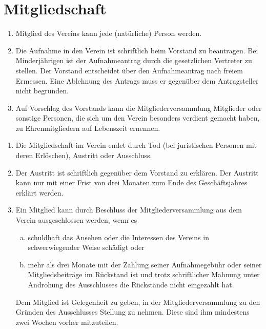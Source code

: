 \documentclass{scrartcl}
\begin{document}
\section{Mitgliedschaft}
\begin{contract}
\Clause[title={Erwerb der Mitgliedschaft}]    
\begin{enumerate}
    \item Mitglied des Vereins kann jede (natürliche) Person werden.
    \item Die Aufnahme in den Verein ist schriftlich beim Vorstand zu beantragen. Bei Minderjährigen ist der Aufnahmeantrag durch die gesetzlichen Vertreter zu stellen. Der Vorstand entscheidet über den Aufnahmeantrag nach freiem Ermessen. Eine Ablehnung des Antrags muss er gegenüber dem Antragsteller nicht begründen.
    \item Auf Vorschlag des Vorstands kann die Mitgliederversammlung Mitglieder oder sonstige Personen, die sich um den Verein besonders verdient gemacht haben, zu Ehrenmitgliedern auf Lebenszeit ernennen.
\end{enumerate}

\Clause[title={Beendigung der Mitgliedschaft}]
\begin{enumerate}
    \item Die Mitgliedschaft im Verein endet durch Tod (bei juristischen Personen mit deren Erlöschen), Austritt oder Ausschluss.
    \item Der Austritt ist schriftlich gegenüber dem Vorstand zu erklären. Der Austritt kann nur mit einer Frist von drei Monaten zum Ende des Geschäftsjahres erklärt werden.
    \item Ein Mitglied kann durch Beschluss der Mitgliederversammlung aus dem Verein
    ausgeschlossen werden, wenn es 
    \begin{enumerate}[(a)]
        \item schuldhaft das Ansehen oder die Interessen des
        Vereins in schwerwiegender Weise schädigt oder
        \item mehr als drei Monate mit der Zahlung
        seiner Aufnahmegebühr oder seiner Mitgliedsbeiträge im Rückstand ist und trotz schriftlicher
        Mahnung unter Androhung des Ausschlusses die Rückstände nicht eingezahlt hat.
    \end{enumerate}
    Dem Mitglied ist Gelegenheit zu geben, in der Mitgliederversammlung zu den Gründen des Ausschlusses Stellung zu nehmen. Diese sind ihm mindestens zwei Wochen vorher mitzuteilen.
\end{enumerate}


\end{contract}
\end{document}
